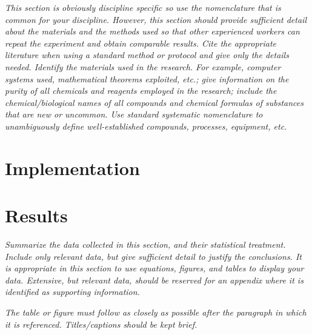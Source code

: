 \documentclass[11pt,a4paper,oneside]{report}
\newcommand{\instructions}[1]{{\color{orange}\itshape #1}}
\begin{document}
\instructions{This section is obviously discipline specific so use the
nomenclature that is common for your discipline. However, this section
should provide sufficient detail about the materials and the methods
used so that other experienced workers can repeat the experiment and
obtain comparable results. Cite the appropriate literature when using a
standard method or protocol and give only the details needed. Identify
the materials used in the research. For example, computer systems used,
mathematical theorems exploited, etc.; give information on the purity of
all chemicals and reagents employed in the research; include the
chemical/biological names of all compounds and chemical formulas of
substances that are new or uncommon. Use standard systematic
nomenclature to unambiguously define well-established compounds,
processes, equipment, etc.}




\chapter{Implementation}
\label{implementation}




\chapter{Results}
\label{results}

\instructions{Summarize the data collected in this section, and their
statistical treatment. Include only relevant data, but give sufficient
detail to justify the conclusions. It is appropriate in this section to
use equations, figures, and tables to display your data. Extensive, but
relevant data, should be reserved for an appendix where it is identified
as supporting information.}

\instructions{The table or figure must follow as closely as possible after the
paragraph in which it is referenced. Titles/captions should be kept
brief.}
\end{document}
